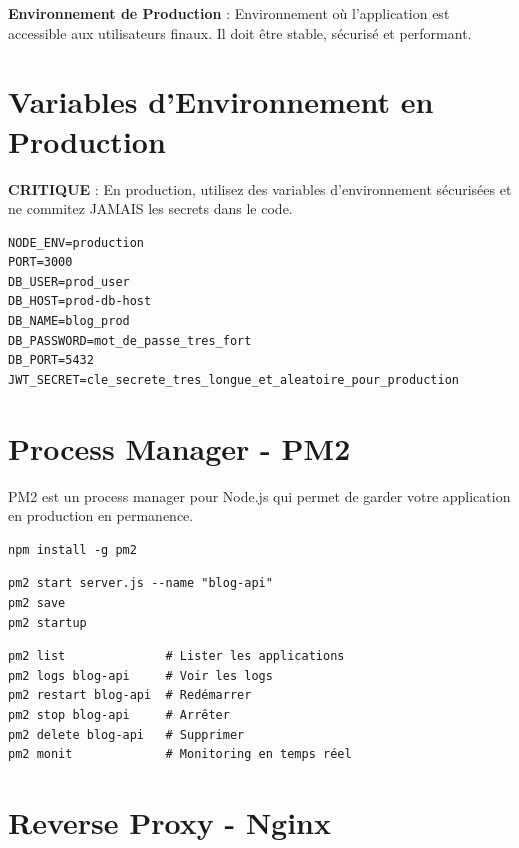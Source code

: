 \begin{definitionbox}
    \textbf{Environnement de Production} : Environnement où l'application est accessible aux utilisateurs finaux. Il doit être stable, sécurisé et performant.
\end{definitionbox}

\section{Variables d'Environnement en Production}

\begin{warningbox}
    \textbf{CRITIQUE} : En production, utilisez des variables d'environnement sécurisées et ne commitez JAMAIS les secrets dans le code.
\end{warningbox}

\begin{lstlisting}[style=bash, caption=.env.production]
NODE_ENV=production
PORT=3000
DB_USER=prod_user
DB_HOST=prod-db-host
DB_NAME=blog_prod
DB_PASSWORD=mot_de_passe_tres_fort
DB_PORT=5432
JWT_SECRET=cle_secrete_tres_longue_et_aleatoire_pour_production
\end{lstlisting}

\section{Process Manager - PM2}

PM2 est un process manager pour Node.js qui permet de garder votre application en production en permanence.

\begin{lstlisting}[style=bash, caption=Installation de PM2]
npm install -g pm2
\end{lstlisting}

\begin{lstlisting}[style=bash, caption=Démarrage de l'application avec PM2]
pm2 start server.js --name "blog-api"
pm2 save
pm2 startup
\end{lstlisting}

\begin{lstlisting}[style=bash, caption=Commandes PM2 utiles]
pm2 list              # Lister les applications
pm2 logs blog-api     # Voir les logs
pm2 restart blog-api  # Redémarrer
pm2 stop blog-api     # Arrêter
pm2 delete blog-api   # Supprimer
pm2 monit             # Monitoring en temps réel
\end{lstlisting}

\section{Reverse Proxy - Nginx}

